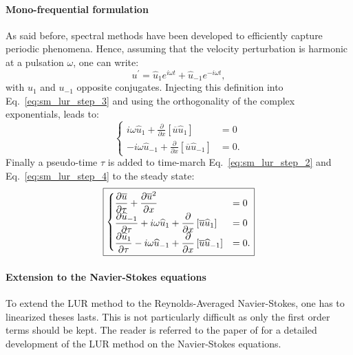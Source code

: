 \paragraph{Mono-frequential formulation}
As said before, spectral methods have been developed to efficiently
capture periodic phenomena.
Hence, assuming that the velocity perturbation is harmonic at 
a pulsation $\omega$, one can write:
\begin{equation}
	u^\prime = \widehat{u}_1 e^{i \omega t} + \widehat{u}_{-1} e^{-i \omega t},
\end{equation}
with $u_1$ and $u_{-1}$ opposite conjugates.
Injecting this definition into Eq.~\ref{eq:sm_lur_step_3} and using
the orthogonality of the complex exponentials, leads
to:
\begin{equation}
	\begin{cases}
		i \omega \widehat{u}_1 +
		\frac{\partial}{\partial x} \left[
		\overline{u} \widehat{u}_1 \right] &= 
		0 \\
		-i \omega \widehat{u}_{-1} +
		\frac{\partial}{\partial x} \left[
		\overline{u} \widehat{u}_{-1} \right] &= 
		0.
	\end{cases}
	\label{eq:sm_lur_step_4}
\end{equation}
Finally a pseudo-time $\tau$ is added to time-march 
Eq.~\ref{eq:sm_lur_step_2} and Eq.~\ref{eq:sm_lur_step_4}
to the steady state:
\begin{equation}
	\fbox{$
	\begin{cases}
		\displaystyle 
		\frac{\partial \overline{u}}{\partial \tau} +
		\frac{\partial 
			\overline{u}^2}{\partial x} &= 0 \\
		\displaystyle \frac{\partial \widehat{u}_{-1}}{\partial \tau} +
		i \omega \widehat{u}_1 +
			\frac{\partial}{\partial x} \left[
			\overline{u} \widehat{u}_1 \right] &= 
			0 \\
		\displaystyle \frac{\partial \widehat{u}_1}{\partial \tau}
		-i \omega \widehat{u}_{-1} +
			\frac{\partial}{\partial x} \left[
			\overline{u} \widehat{u}_{-1} \right] &= 
			0.
	\end{cases}
	$}
\end{equation}

\paragraph{Extension to the Navier-Stokes equations}
To extend the LUR method to the Reynolds-Averaged
Navier-Stokes, one has to linearized theses lasts. This
is not particularly difficult as only the first order terms should
be kept. The reader is referred to the paper of \citet{Clark2000} for
a detailed development of the LUR method on the Navier-Stokes
equations.

